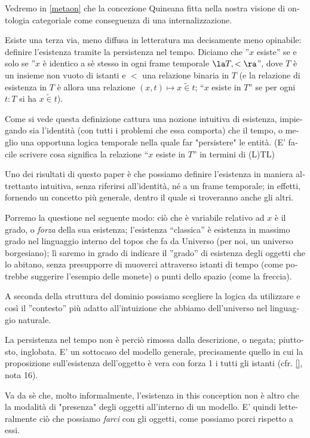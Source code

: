 \documentclass{amsart}
\begin{document}
\begin{italian}
 	Vedremo in \autoref{metaon} che la concezione Quineana fitta nella nostra visione di ontologia categoriale come conseguenza di una internalizzazione. 
 	
 	Esiste una terza via, meno diffusa in letteratura ma decisamente meno opinabile: definire l'esistenza tramite la persistenza nel tempo. Diciamo che ''$x$ esiste'' se e solo se ''$x$ è identico a sè stesso in ogni frame temporale $\la T,<\ra$'', dove $T$ è un insieme non vuoto di istanti e $<$ una relazione binaria in $T$ (e la relazione di esistenza in $T$ è allora una relazione $(x,t)\mapsto x\mathrel{\tilde\in} t$; ``$x$ esiste in $T$'' se per ogni $t : T$ si ha $x\mathrel{\tilde\in} t$).
 	
 	Come si vede questa definizione cattura una nozione intuitiva di esistenza, impiegando sia l'identità (con tutti i problemi che essa comporta) che il tempo, o meglio una opportuna logica temporale nella quale far "persistere" le entità. (E' facile scrivere cosa significa la relazione ``$x$ esiste in $T$'' in termini di (L)TL)
 	
	 Uno dei risultati di questo paper è che possiamo definire l'esistenza in maniera altrettanto intuitiva, senza riferirsi all'identità, né a un frame temporale; in effetti, fornendo un concetto più generale, dentro il quale si troveranno anche gli altri.
	 
	 Porremo la questione nel seguente modo: ciò che è variabile relativo ad $x$ è il grado, o \emph{forza} della sua esistenza; l'esistenza ``classica'' è esistenza in massimo grado nel linguaggio interno del topos che fa da Universo (per noi, un universo borgesiano); lì saremo in grado di indicare il ''grado'' di esistenza degli oggetti che lo abitano, senza presupporre di muoverci attraverso istanti di tempo (come potrebbe suggerire l'esempio delle monete) o punti dello spazio (come la freccia).
	  
	 A seconda della struttura del dominio possiamo scegliere la logica da utilizzare e così il ''contesto'' più adatto all'intuizione che abbiamo dell'universo nel linguaggio naturale. 
 	
 	La persistenza nel tempo non è perciò rimossa dalla descrizione, o negata; piuttosto, inglobata. E' un sottocaso del modello generale, precisamente quello in cui la proposizione sull'esistenza dell'oggetto è vera con forza 1 i tutti gli istanti (cfr. \autoref{}, nota 16).
 	
 	Va da sè che, molto informalmente, l'esistenza in this conception non è altro che la modalità di "presenza" degli oggetti all'interno di un modello. E' quindi letteralmente ciò che possiamo \emph{farci} con gli oggetti, come possiamo porci rispetto a essi. 
 	

\end{italian}
\end{document}
